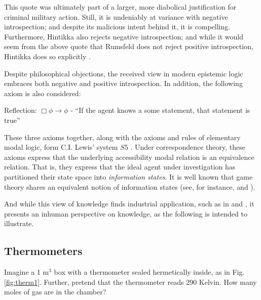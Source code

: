 \documentclass[11pt]{article}
\numberwithin{equation}{subsection}
\begin{document}
This quote was ultimately part of a larger, more diabolical justification for criminal military action.  Still, it is undeniably at variance with negative introspection; and despite its malicious intent behind it, it is compelling.  Furthermore, Hintikka also rejects negative introspection; and while it would seem from the above quote that Rumsfeld does not reject positive introspection, Hintikka does so explicitly \citep{hintikka_knowledge_1969}.

Despite philosophical objections, the received view in modern epistemic logic embraces both negative and positive introspection.  In addition, the following axiom is also considered:
\begin{bul}
	\item Reflection: $\Box \phi \to \phi$ - ``If the agent knows a some statement, that statement is true''
\end{bul}
These three axioms together, along with the axioms and rules of elementary modal logic, form C.I. Lewis' system $S5$ \citep{lewis_symbolic_1951}.  Under correspondence theory, these axioms express that the underlying accessibility modal relation is an equivalence relation. That is, they express that the ideal agent under investigation has partitioned their state space into \emph{information states}.  It is well known that game theory shares an equivalent notion of information states (see, for instance, \citet{halpern_set-theoretic_1999} and \citet[chapter 3]{rubinstein_modeling_1998}).

And while this view of knowledge finds industrial application, such as in \citet{agray_ban_2002} and \citet{hommersom_toward_2005,hommersom_update_2004}, it presents an inhuman perspective on knowledge, as the following is intended to illustrate.

\subsection{Thermometers}\label{thermometers}
Imagine a 1 m$^3$ box with a thermometer sealed hermetically inside, as in Fig.  \ref{fig:therm1}.  Further, pretend that the thermometer reads 290 Kelvin.  How many moles of gas are in the chamber?
\end{document}

